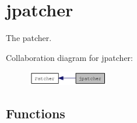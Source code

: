 \hypertarget{group__jpatcher}{
\section{jpatcher}
\label{group__jpatcher}
}


The patcher.  


Collaboration diagram for jpatcher:\nopagebreak
\begin{figure}[H]
\begin{center}
\leavevmode
\includegraphics[width=100pt]{group__jpatcher}
\end{center}
\end{figure}
\subsection*{Functions}
